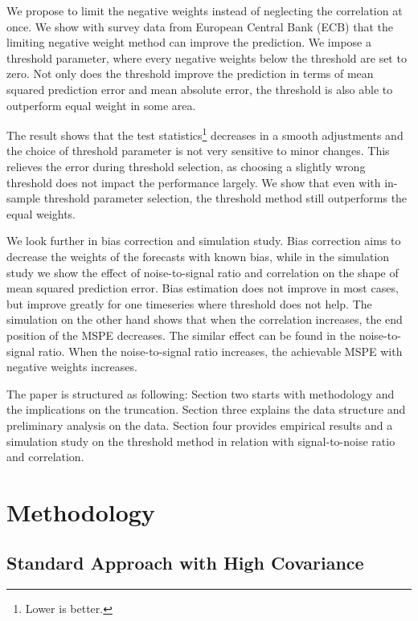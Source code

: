 \documentclass[11pt]{article}
\let\rmarkdownfootnote\footnote%
\def\footnote{\protect\rmarkdownfootnote}
\begin{document}
We propose to limit the negative weights instead of neglecting the correlation at once. We show with survey data from European Central Bank (ECB) that the limiting negative weight method can improve the prediction. We impose a threshold parameter, where every negative weights below the threshold are set to zero. Not only does the threshold improve the prediction in terms of mean squared prediction error and mean absolute error, the threshold is also able to outperform equal weight in some area.

The result shows that the test statistics\footnote{Lower is better.} decreases in a smooth adjustments and the choice of threshold parameter is not very sensitive to minor changes. This relieves the error during threshold selection, as choosing a slightly wrong threshold does not impact the performance largely. We show that even with in-sample threshold parameter selection, the threshold method still outperforms the equal weights.

We look further in bias correction and simulation study. Bias correction aims to decrease the weights of the forecasts with known bias, while in the simulation study we show the effect of noise-to-signal ratio and correlation on the shape of mean squared prediction error. Bias estimation does not improve in most cases, but improve greatly for one timeseries where threshold does not help. The simulation on the other hand shows that when the correlation increases, the end position of the MSPE decreases. The similar effect can be found in the noise-to-signal ratio. When the noise-to-signal ratio increases, the achievable MSPE with negative weights increases.

The paper is structured as following: Section two starts with methodology and the implications on the truncation. Section three explains the data structure and preliminary analysis on the data. Section four provides empirical results and a simulation study on the threshold method in relation with signal-to-noise ratio and correlation.

\section{Methodology}\label{methodology}

\subsection{Standard Approach with High Covariance}\label{standard-approach}
\end{document}
